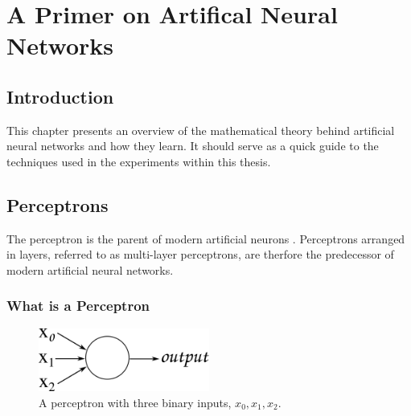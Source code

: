 
\chapter{A Primer on Artifical Neural Networks} %

\label{Chapter3} %


\section{Introduction}
This chapter presents an overview of the mathematical theory behind artificial neural networks and how they learn. It should serve as a quick guide to the techniques used in the experiments within this thesis.

\section{Perceptrons}
\label{sec:percep}
The perceptron is the parent of modern artificial neurons \cite{rosenblatt1958perceptron}.
Perceptrons arranged in layers, referred to as multi-layer perceptrons, are therfore the predecessor of modern artificial neural networks.

\subsection{What is a Perceptron}



\begin{figure}
	\centering
	\includegraphics[width=0.5\textwidth]{Figs/intro2dl/perceptron.png}
	
	\caption{A perceptron with three binary inputs, $x_0, x_1, x_2$.}
	\label{fig:perceptron}
\end{figure}

